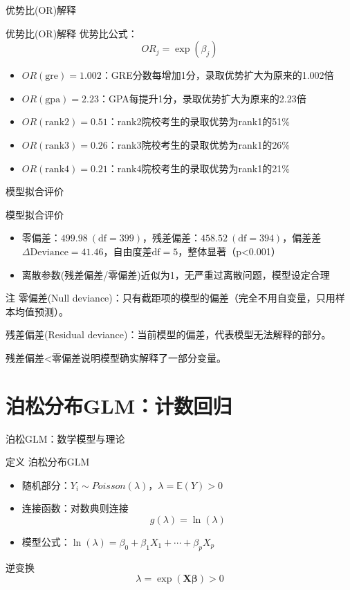 \documentclass[aspectratio=169]{beamer}
\begin{document}
\begin{frame}{优势比(OR)解释}
\begin{block}{优势比(OR)解释}
优势比公式：\[ OR_j=\exp(\beta_j) \]
\begin{itemize}
\item $OR(\text{gre})=1.002$：GRE分数每增加1分，录取优势扩大为原来的1.002倍
\item $OR(\text{gpa})=2.23$：GPA每提升1分，录取优势扩大为原来的2.23倍
\item $OR(\text{rank2})=0.51$：rank2院校考生的录取优势为rank1的51\%
\item $OR(\text{rank3})=0.26$：rank3院校考生的录取优势为rank1的26\%
\item $OR(\text{rank4})=0.21$：rank4院校考生的录取优势为rank1的21\%
\end{itemize}
\end{block}
\end{frame}

\begin{frame}{模型拟合评价}
\begin{block}{模型拟合评价}
\begin{itemize}
\item 零偏差：$499.98\ (\text{df}=399)$，残差偏差：$458.52\ (\text{df}=394)$，偏差差 $\Delta\text{Deviance}=41.46$，自由度差$\text{df}=5$，整体显著（p<0.001）

\item 离散参数(残差偏差/零偏差)近似为1，无严重过离散问题，模型设定合理
\end{itemize}
\end{block}
\begin{alertblock}{注}
零偏差(Null deviance)：只有截距项的模型的偏差（完全不用自变量，只用样本均值预测）。

残差偏差(Residual deviance)：当前模型的偏差，代表模型无法解释的部分。

残差偏差<零偏差说明模型确实解释了一部分变量。
\end{alertblock}
\end{frame}

\section{泊松分布GLM：计数回归}

\begin{frame}{泊松GLM：数学模型与理论}
\begin{block}{定义 泊松分布GLM}
\begin{itemize}
\item 随机部分：$Y_i\sim Poisson(\lambda)$，$\lambda=\mathbb{E}(Y)>0$
\item 连接函数：对数典则连接
\[ g(\lambda)=\ln(\lambda) \]
\item 模型公式：$\ln(\lambda)=\beta_0+\beta_1X_1+\cdots+\beta_pX_p$
\end{itemize}
\end{block}
\begin{block}{逆变换}
\[ \lambda=\exp(\boldsymbol{X\beta})>0 \]
\end{block}
\end{frame}
\end{document}
